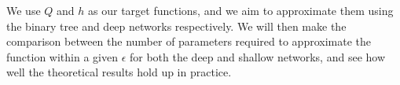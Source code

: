 \documentclass[11pt,a4paper]{article}
\theoremstyle{plain}
\theoremstyle{definition}
\theoremstyle{remark}
\begin{document}
We use \(Q\) and \(h\) as our target functions, and we aim to approximate them using the binary tree and deep networks respectively. We will then make the comparison between the number of parameters required to approximate the function within a given \(\epsilon \) for both the deep and shallow networks, and see how well the theoretical results hold up in practice.
\end{document}
